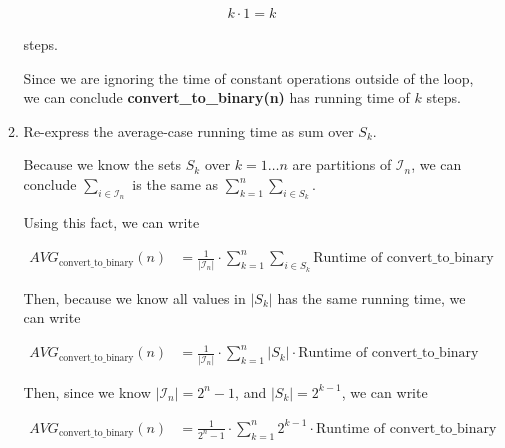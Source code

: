 \documentclass[12pt]{article}
\begin{document}
\begin{enumerate}[a.]
\begin{mdframed}
\begin{enumerate}[1.]
\begin{mdframed}
        \begin{align}
            k \cdot 1 = k
        \end{align}

        steps.

        \bigskip

        Since we are ignoring the time of constant operations outside of the loop,
        we can conclude \textbf{convert\_to\_binary(n)} has running time of $k$ steps.

        \end{mdframed}

        \item Re-express the average-case running time as sum over $S_k$.

        \begin{mdframed}

            Because we know the sets $S_k$ over $k = 1 \dots n$ are partitions of
            $\mathcal{I}_n$, we can conclude $\sum\limits_{i \in \mathcal{I}_n}$
            is the same as $\sum\limits_{k = 1}^n \sum\limits_{i \in S_k}$.

            \bigskip

            Using this fact, we can write

            \begin{align}
                AVG_{\text{convert\_to\_binary}}(n) &= \frac{1}{\lvert \mathcal{I}_n \rvert} \cdot \sum\limits_{k = 1}^n \sum\limits_{i \in S_k} \text{Runtime of convert\_to\_binary}
            \end{align}

            \bigskip

            Then, because we know all values in $\lvert S_k \rvert$ has the same
            running time, we can write

            \begin{align}
                AVG_{\text{convert\_to\_binary}}(n) &= \frac{1}{\lvert \mathcal{I}_n \rvert} \cdot \sum\limits_{k = 1}^n \lvert S_k \rvert \cdot \text{Runtime of convert\_to\_binary}
            \end{align}

            \bigskip

            Then, since we know $\lvert \mathcal{I}_n \rvert = 2^n - 1$, and
            $\lvert S_k \rvert = 2^{k-1}$, we can write

            \begin{align}
                AVG_{\text{convert\_to\_binary}}(n) &= \frac{1}{2^n - 1} \cdot \sum\limits_{k = 1}^n 2^{k-1} \cdot \text{Runtime of convert\_to\_binary}
            \end{align}


\end{mdframed}
\end{enumerate}
\end{mdframed}
\end{enumerate}
\end{document}
